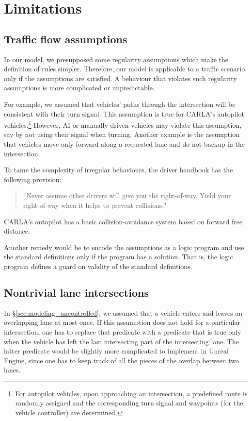 \section{Limitations}
\label{sec:limitations}

\subsection{Traffic flow assumptions}
In our model,
we presupposed some regularity assumptions
which make the definition of rules simpler.
Therefore,
our model is applicable to a traffic scenario
only if the assumptions are satisfied.
A behaviour that violates such regularity assumptions
is more complicated or unpredictable.

For example,
we assumed that vehicles' paths through the intersection
will be consistent with their turn signal.
This assumption
is true for CARLA's autopilot vehicles.\footnote{For autopilot vehicles,
upon approaching an intersection,
a predefined route is randomly assigned
and the corresponding turn signal and waypoints (for the vehicle controller) are determined.
}
However,
AI or manually driven vehicles may violate this assumption,
say by not using their signal when turning.
Another example is the assumption that
vehicles move only forward along a requested lane
and do not backup in the intersection.

To tame the complexity of irregular behaviours,
the driver handbook has the following provision:
\begin{quote}
    ``Never assume other drivers will give you the right-of-way.
    Yield your right-of-way when it helps to prevent collisions."
    \cite[p. 34]{DMV-California.2019}
\end{quote}
CARLA's autopilot has a basic collision-avoidance system
based on forward free distance.

Another remedy would be to
encode the assumptions as a logic program and
use the standard definitions only if the program has a solution.
That is,
the logic program defines a guard on validity of the standard definitions.

\subsection{Nontrivial lane intersections}
In \S \ref{sec:modeling_uncontrolled},
we assumed that a vehicle enters and leaves an overlapping lane at most once.
If this assumption does not hold for a particular intersection,
one has to replace that predicate with a predicate that is true only when the vehicle has left the last intersecting part of the intersecting lane. The latter predicate would be slightly more complicated to implement in Unreal Engine,
since one has to keep track of all the pieces of the overlap between two lanes.
